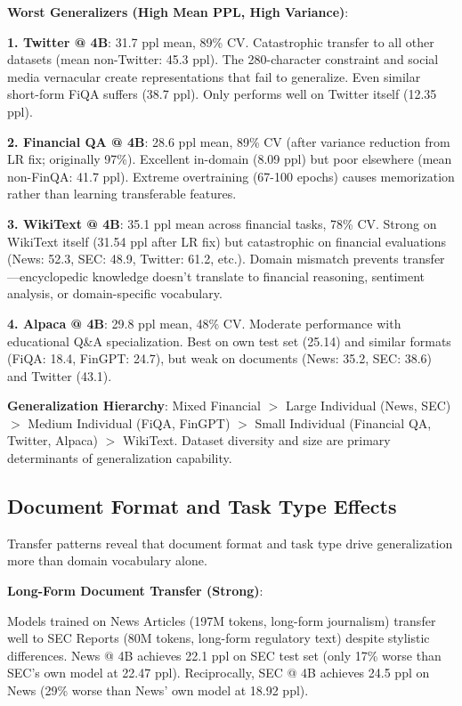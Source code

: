 \textbf{Worst Generalizers (High Mean PPL, High Variance)}:

\textbf{1. Twitter @ 4B}: 31.7 ppl mean, 89\% CV. Catastrophic transfer to all other datasets (mean non-Twitter: 45.3 ppl). The 280-character constraint and social media vernacular create representations that fail to generalize. Even similar short-form FiQA suffers (38.7 ppl). Only performs well on Twitter itself (12.35 ppl).

\textbf{2. Financial QA @ 4B}: 28.6 ppl mean, 89\% CV (after variance reduction from LR fix; originally 97\%). Excellent in-domain (8.09 ppl) but poor elsewhere (mean non-FinQA: 41.7 ppl). Extreme overtraining (67-100 epochs) causes memorization rather than learning transferable features.

\textbf{3. WikiText @ 4B}: 35.1 ppl mean across financial tasks, 78\% CV. Strong on WikiText itself (31.54 ppl after LR fix) but catastrophic on financial evaluations (News: 52.3, SEC: 48.9, Twitter: 61.2, etc.). Domain mismatch prevents transfer—encyclopedic knowledge doesn't translate to financial reasoning, sentiment analysis, or domain-specific vocabulary.

\textbf{4. Alpaca @ 4B}: 29.8 ppl mean, 48\% CV. Moderate performance with educational Q\&A specialization. Best on own test set (25.14) and similar formats (FiQA: 18.4, FinGPT: 24.7), but weak on documents (News: 35.2, SEC: 38.6) and Twitter (43.1).

\textbf{Generalization Hierarchy}: Mixed Financial $>$ Large Individual (News, SEC) $>$ Medium Individual (FiQA, FinGPT) $>$ Small Individual (Financial QA, Twitter, Alpaca) $>$ WikiText. Dataset diversity and size are primary determinants of generalization capability.

\subsection{Document Format and Task Type Effects}

Transfer patterns reveal that document format and task type drive generalization more than domain vocabulary alone.

\textbf{Long-Form Document Transfer (Strong)}:

Models trained on News Articles (197M tokens, long-form journalism) transfer well to SEC Reports (80M tokens, long-form regulatory text) despite stylistic differences. News @ 4B achieves 22.1 ppl on SEC test set (only 17\% worse than SEC's own model at 22.47 ppl). Reciprocally, SEC @ 4B achieves 24.5 ppl on News (29\% worse than News' own model at 18.92 ppl).

